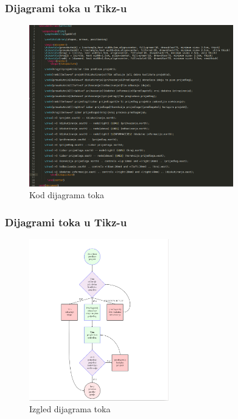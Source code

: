 \documentclass{beamer}
\begin{document}
	\begin{frame}
	\frametitle{Dijagrami toka u Tikz-u}
		\begin{figure}
			\begin{center}
				\includegraphics[width=12 cm,height=7cm]{kod.png}
				\caption{Kod dijagrama toka}
			\end{center}
		\end{figure}
	\end{frame}

	\begin{frame}
	\frametitle{Dijagrami toka u Tikz-u}
	\begin{figure}
		\begin{center}
			\includegraphics[width=12 cm,height=7cm]{izgled.png}
			\caption{Izgled dijagrama toka}
		\end{center}
	\end{figure}
	\end{frame}
\end{document}
